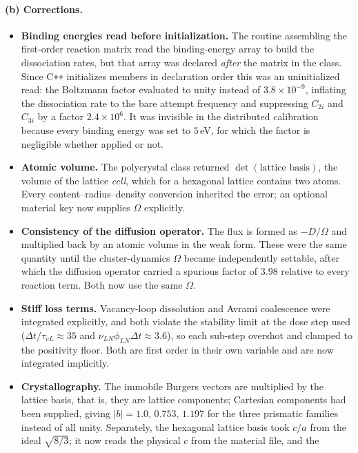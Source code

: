 \documentclass{article}
\begin{document}
\paragraph*{(b) Corrections.}
\begin{itemize}
\item \textbf{Binding energies read before initialization.} The routine
assembling the first-order reaction matrix read the binding-energy array to build
the dissociation rates, but that array was declared \emph{after} the matrix in
the class. Since C\texttt{++} initializes members in declaration order this was an
uninitialized read: the Boltzmann factor evaluated to unity instead of
$3.8\times10^{-9}$, inflating the dissociation rate to the bare attempt frequency
and suppressing $C_{2i}$ and $C_{3i}$ by a factor $2.4\times10^{6}$. It was
invisible in the distributed calibration because every binding energy was set to
$5\,$eV, for which the factor is negligible whether applied or not.
\item \textbf{Atomic volume.} The polycrystal class returned
$\det(\text{lattice basis})$, the volume of the lattice \emph{cell}, which for a
hexagonal lattice contains two atoms. Every content--radius--density conversion
inherited the error; an optional material key now supplies $\Omega$ explicitly.
\item \textbf{Consistency of the diffusion operator.} The flux is formed as
$-D/\Omega$ and multiplied back by an atomic volume in the weak form. These were
the same quantity until the cluster-dynamics $\Omega$ became independently
settable, after which the diffusion operator carried a spurious factor of $3.98$
relative to every reaction term. Both now use the same $\Omega$.
\item \textbf{Stiff loss terms.} Vacancy-loop dissolution and Avrami coalescence
were integrated explicitly, and both violate the stability limit at the dose step
used ($\Delta t/\tau_{vL}\approx35$ and
$\nu_{LN}\phi_{LN}\Delta t\approx3.6$), so each sub-step overshot and clamped to
the positivity floor. Both are first order in their own variable and are now
integrated implicitly.
\item \textbf{Crystallography.} The immobile Burgers vectors are multiplied by
the lattice basis, that is, they are lattice components; Cartesian components had
been supplied, giving $|b|=1.0,\,0.753,\,1.197$ for the three prismatic families
instead of all unity. Separately, the hexagonal lattice basis took $c/a$ from the
ideal $\sqrt{8/3}$; it now reads the physical $c$ from the material file, and the

\end{itemize}
\end{document}
